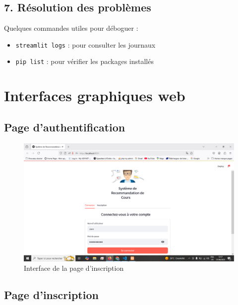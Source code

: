 \subsection{7. Résolution des problèmes}

Quelques commandes utiles pour déboguer :

\begin{itemize}
  \item \texttt{streamlit logs} : pour consulter les journaux
  \item \texttt{pip list} : pour vérifier les packages installés
\end{itemize}
\newpage
\section{Interfaces graphiques web}


\subsection*{Page d'authentification}
\begin{figure}[h]
    \centering
    \includegraphics[width=\linewidth]{images/auth.png}
    \caption{Interface de la page d'inscription}
\end{figure}


\subsection*{Page d'inscription}
